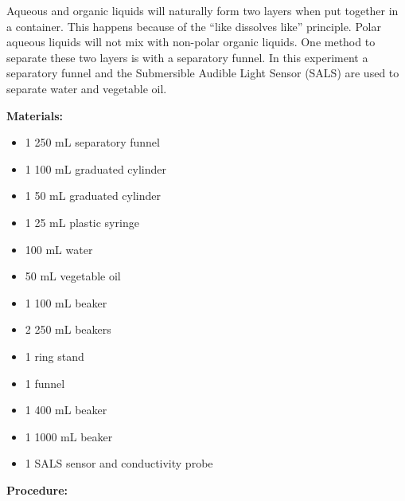 \documentclass[11.5pt]{sig-alternate} %
\begin{document}
\begin{large}
Aqueous and organic liquids will naturally form two layers when put together in a container. This happens because of the “like dissolves like” principle. Polar aqueous liquids will not mix with non-polar organic liquids. One method to separate these two layers is with a separatory funnel. In this experiment a separatory funnel and the Submersible Audible Light Sensor (SALS) are used to separate water and vegetable oil.

\newpage
\textbf{Materials:}

\begin{itemize}
    \item  1 250 mL separatory funnel
    \item  1 100 mL graduated cylinder
    \item  1 50 mL graduated cylinder
    \item  1 25 mL plastic syringe
    \item  100 mL water
    \item  50 mL vegetable oil
    \item  1 100 mL beaker
    \item  2 250 mL beakers
    \item  1 ring stand
    \item  1 funnel
    \item  1 400 mL beaker
    \item  1 1000 mL beaker
    \item  1 SALS sensor and conductivity probe
\end{itemize}

\textbf{Procedure:}


\end{large}
\end{document}
